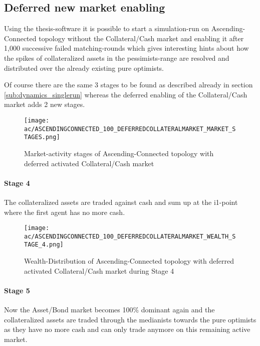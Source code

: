 \documentclass[Bachelorarbeit.tex]{subfiles}
\begin{document}
\subsection{Deferred new market enabling}
Using the thesis-software it is possible to start a simulation-run on Ascending-Connected topology without the Collateral/Cash market and enabling it after 1,000 successive failed matching-rounds which gives interesting hints about how the spikes of collateralized assets in the pessimists-range are resolved and distributed over the already existing pure optimists.

\medskip

Of course there are the same 3 stages to be found as described already in section \ref{sub:dynamics_singlerun} whereas the deferred enabling of the Collateral/Cash market adds 2 new stages.

\begin{figure}[H]
	\centering
  \texttt{[image: ac/ASCENDINGCONNECTED\_100\_DEFERREDCOLLATERALMARKET\_MARKET\_STAGES.png]}
  	\caption{Market-activity stages of Ascending-Connected topology with deferred activated Collateral/Cash market}
	\label{fig:markets_ASCENDINGCONNECTED_100_DEFERREDCOLLATERALMARKET_MARKET_STAGES}
\end{figure}

\paragraph{Stage 4}
The collateralized assets are traded against cash and sum up at the i1-point where the first agent has no more cash. 

\begin{figure}[H]
	\centering
  \texttt{[image: ac/ASCENDINGCONNECTED\_100\_DEFERREDCOLLATERALMARKET\_WEALTH\_STAGE\_4.png]}
  	\caption{Wealth-Distribution of Ascending-Connected topology with deferred activated Collateral/Cash market during Stage 4}
	\label{fig:markets_ASCENDINGCONNECTED_100_DEFERREDCOLLATERALMARKET_WEALTH_STAGE_4}
\end{figure}

\paragraph{Stage 5}
Now the Asset/Bond market becomes 100\% dominant again and the collateralized assets are traded through the medianists towards the pure optimists as they have no more cash and can only trade anymore on this remaining active market.
\end{document}
